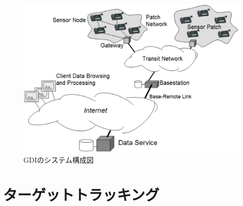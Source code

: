 \begin{figure}[htbp]
 \begin{center}
  \includegraphics[width=120mm]{./images/gdi_system_architecture.eps}
 \end{center}
 \caption{GDIのシステム構成図}
 \label{fig:gdi_system_architecture}
\end{figure}




\section{ターゲットトラッキング}

%
%

